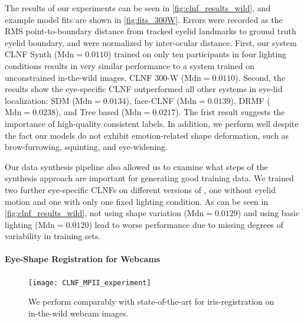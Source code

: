 The results of our experiments can be seen in \autoref{fig:clnf_results_wild}, and example model fits are shown in \autoref{fig:fits_300W}.
Errors were recorded as the RMS point-to-boundary distance from tracked eyelid landmarks to ground truth eyelid boundary, and were normalized by inter-ocular distance. 
%
First, our system CLNF Synth ($\mathrm{Mdn}=0.0110$) trained on only ten participants in four lighting conditions results in very similar performance to a system trained on unconstrained in-the-wild images, CLNF 300-W ($\mathrm{Mdn}=0.0110$).
%
Second, the results show the eye-specific CLNF outperformed all other systems in eye-lid localization: SDM ($\mathrm{Mdn}=0.0134$), face-CLNF ($\mathrm{Mdn}=0.0139$), DRMF ($\mathrm{Mdn}=0.0238$), and Tree based ($\mathrm{Mdn}=0.0217$). 
The frist result suggests the importance of high-quality consistent labels. In addition, we perform well despite the fact our models do not exhibit emotion-related shape deformation, such as brow-furrowing, squinting, and eye-widening.

Our data synthesis pipeline also allowed us to examine what steps of the synthesis approach are important for generating good training data. We trained two further eye-specific CLNFs on different versions of \dataset, one without eyelid motion and one with only one fixed lighting condition. As can be seen in \autoref{fig:clnf_results_wild}, not using shape variation ($\mathrm{Mdn}=0.0129$) and using basic lighting ($\mathrm{Mdn}=0.0120$) lead to worse performance due to missing degrees of variability in training sets.

\paragraph{Eye-Shape Registration for Webcams}




\begin{figure}
    \centering
    \texttt{[image: CLNF\_MPII\_experiment]}
    \caption{We perform comparably with state-of-the-art for iris-registration on in-the-wild webcam images.}
    \label{fig:clnf_results_MPII}
\end{figure}

